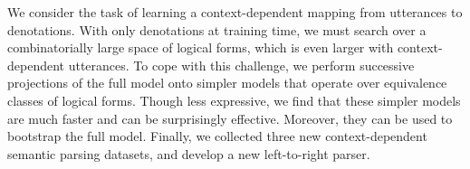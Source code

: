 We consider the task of learning a context-dependent mapping from utterances to denotations. With only denotations at training time, we must search over a combinatorially large space of logical forms, which is even larger with context-dependent utterances. To cope with this challenge, we perform successive projections of the full model onto simpler models that operate over equivalence classes of logical forms. Though less expressive, we find that these simpler models are much faster and can be surprisingly effective. Moreover, they can be used to bootstrap the full model. Finally, we collected three new context-dependent semantic parsing datasets, and develop a new left-to-right parser.
